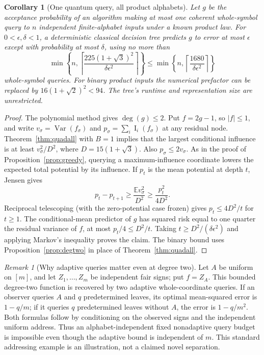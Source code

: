 \documentclass[11pt]{article}
\numberwithin{equation}{section}
\newtheorem{corollary}[theorem]{Corollary}
\theoremstyle{remark}
\newtheorem{remark}[theorem]{Remark}
\newcommand{\E}{\mathbb E}
\newcommand{\Var}{\operatorname{Var}}
\newcommand{\Inf}{\operatorname{I}}
\begin{document}
\begin{corollary}[One quantum query, all product alphabets]\label{cor:onequery}
Let $g$ be the acceptance probability of an algorithm making at most one coherent whole-symbol query to $n$ independent finite-alphabet inputs under a known product law. For $0<\epsilon,\delta<1$, a deterministic classical decision tree predicts $g$ to error at most $\epsilon$ except with probability at most $\delta$, using no more than
\begin{equation}\label{eq:onequery}
 \min\left\{n,\left\lceil\frac{225(1+\sqrt3)^2}{\delta\epsilon^2}\right\rceil\right\}
 \le \min\left\{n,\left\lceil\frac{1680}{\delta\epsilon^2}\right\rceil\right\}
\end{equation}
whole-symbol queries. For binary product inputs the numerical prefactor can be replaced by $16(1+\sqrt2)^2<94$. The tree's runtime and representation size are unrestricted.
\end{corollary}
\begin{proof}
The polynomial method gives $\deg(g)\le2$. Put $f=2g-1$, so $|f|\le1$, and write $v_\sigma=\Var(f_\sigma)$ and $p_\sigma=\sum_i\Inf_i(f_\sigma)$ at any residual node. Theorem~\ref{thm:quadall} with $B=1$ implies that the largest conditional influence is at least $v_\sigma^2/D^2$, where $D=15(1+\sqrt3)$. Also $p_\sigma\le2v_\sigma$. As in the proof of Proposition~\ref{prop:greedy}, querying a maximum-influence coordinate lowers the expected total potential by its influence. If $p_t$ is the mean potential at depth $t$, Jensen gives
\[
 p_t-p_{t+1}\ge\frac{\E v_\sigma^2}{D^2}\ge\frac{p_t^2}{4D^2}.
\]
Reciprocal telescoping (with the zero-potential case frozen) gives $p_t\le4D^2/t$ for $t\ge1$. The conditional-mean predictor of $g$ has squared risk equal to one quarter the residual variance of $f$, at most $p_t/4\le D^2/t$. Taking $t\ge D^2/(\delta\epsilon^2)$ and applying Markov's inequality proves the claim. The binary bound uses Proposition~\ref{prop:degtwo} in place of Theorem~\ref{thm:quadall}.\end{proof}

\begin{remark}[Why adaptive queries matter even at degree two]\label{rem:address}
Let $A$ be uniform on $[m]$, and let $Z_1,\dots,Z_m$ be independent fair signs; put $f=Z_A$. This bounded degree-two function is recovered by two adaptive whole-coordinate queries. If an observer queries $A$ and $q$ predetermined leaves, its optimal mean-squared error is $1-q/m$; if it queries $q$ predetermined leaves without $A$, the error is $1-q/m^2$. Both formulas follow by conditioning on the observed signs and the independent uniform address. Thus an alphabet-independent fixed nonadaptive query budget is impossible even though the adaptive bound is independent of $m$. This standard addressing example is an illustration, not a claimed novel separation.
\end{remark}
\end{document}
